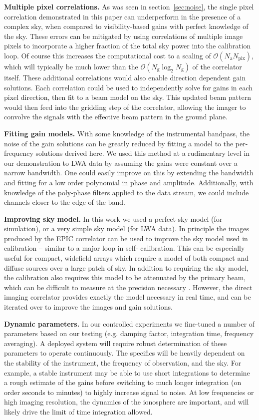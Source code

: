 \documentclass[a4paper,fleqn,usenatbib]{mnras}
\newcommand{\Nant}{\ensuremath{N_{\mathrm{a}}}}
\newcommand{\Ng}{\ensuremath{N_{\mathrm{g}}}}
\begin{document}
\textbf{Multiple pixel correlations.} As was seen in section~\ref{sec:noise}, the single pixel 
correlation demonstrated in this paper can underperform in the presence of a complex sky, 
when compared to visibility-based gains with perfect knowledge of the sky. These errors can be 
mitigated by using correlations of multiple image pixels to incorporate a higher fraction of the 
total sky power into the calibration loop. Of course this increases the computational cost to a 
scaling of $\mathcal{O}(\Nant N_{\mathrm{pix}})$, which will typically be much lower than the 
$\mathcal{O}(\Ng \log_2 \Ng)$ of the correlator itself. These additional correlations would also 
enable direction dependent gain solutions. Each correlation could be used to independently 
solve for gains in each pixel direction, then fit to a beam model on the sky. This updated beam 
pattern would then feed into the gridding step of the correlator, allowing the imager to convolve 
the signals with the effective beam pattern in the ground plane. 

\textbf{Fitting gain models.} With some knowledge of the instrumental bandpass, the noise of 
the gain solutions can be greatly reduced by fitting a model to the per-frequency solutions 
derived here. We used this method at a rudimentary level in our demonstration to LWA data by 
assuming the gains were constant over a narrow bandwidth. One could easily improve on this 
by extending the bandwidth and fitting for a low order polynomial in phase and amplitude. 
Additionally, with knowledge of the poly-phase filters applied to the data stream, we could 
include channels closer to the edge of the band.

\textbf{Improving sky model.} In this work we used a perfect sky model (for simulation), or a 
very simple sky model (for LWA data). In principle the images produced by the EPIC correlator 
can be used to improve the sky model used in calibration -- similar to a major loop in self-
calibration. This can be especially useful for compact, widefield arrays which require a model of 
both compact and diffuse sources over a large patch of sky. In addition to requiring the sky 
model, the calibration also requires this model to be attenuated by the primary beam, which 
can be difficult to measure at the precision necessary \citep[e.g.][]{neb15,vir14,thy15b}. 
However, the direct imaging correlator provides exactly the model necessary in real time, and 
can be iterated over to improve the images and gain solutions.

\textbf{Dynamic parameters.} In our controlled experiments we fine-tuned a number of 
parameters based on our testing (e.g. damping factor, integration time, frequency averaging). A 
deployed system will require robust determination of these parameters to operate continuously. 
The specifics will be heavily dependent on the stability of the instrument, the frequency of 
observation, and the sky. For example, a stable instrument may be able to use short 
integrations to determine a rough estimate of the gains before switching to much longer 
integration (on order seconds to minutes) to highly increase signal to noise. At low frequencies 
or high imaging resolution, the dynamics of the ionosphere are important, and will likely drive 
the limit of time integration allowed.
\end{document}
